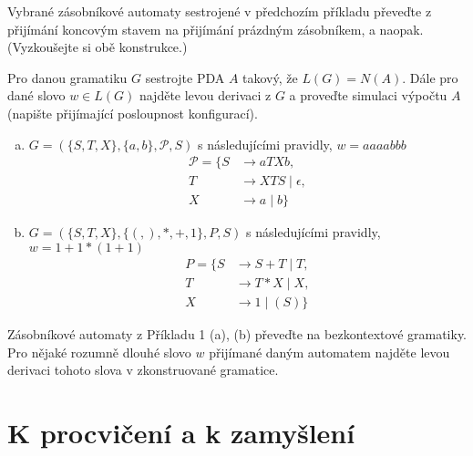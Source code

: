 \documentclass[a4paper,12pt]{amsart}
\begin{document}
\smallskip\begin{problem}

    Vybrané zásobníkové automaty sestrojené v předchozím příkladu převeďte z přijímání koncovým stavem na přijímání prázdným zásobníkem, a naopak. (Vyzkoušejte si obě konstrukce.)

\end{problem}


\smallskip\begin{problem}

    Pro danou gramatiku $G$ sestrojte PDA $A$ takový, že $L(G)=N(A)$. Dále pro dané slovo $w\in L(G)$ najděte levou derivaci z $G$ a proveďte simulaci výpočtu $A$ (napište přijímající posloupnost konfigurací).

    \begin{enumerate}[(a)]\setlength\itemsep{6pt}
        \item $G=(\{S,T,X\},\{a,b\},\mathcal P,S)$ s následujícími pravidly, $w=aaaabbb$
        \begin{align*}
            \mathcal P=\{S&\rightarrow aTXb, \\
            T&\rightarrow XTS\mid \epsilon,\\ 
            X&\rightarrow a\mid b\}
        \end{align*}
        \item $G=(\{S,T,X\},\{(,),*,+,1\},P,S)$ s následujícími pravidly, $w=1+1*(1+1)$
        \begin{align*}
            P=\{S&\rightarrow S+T\mid T, \\
            T&\rightarrow T*X\mid X,\\ 
            X&\rightarrow 1\mid (S)\}
        \end{align*}
    \end{enumerate}

\end{problem}
    

\begin{problem}

    Zásobníkové automaty z Příkladu 1 (a), (b) převeďte na bezkontextové gramatiky. Pro nějaké rozumně dlouhé slovo $w$ přijímané daným automatem najděte levou derivaci tohoto slova v zkonstruované gramatice.

\end{problem}


\section*{K procvičení a k zamyšlení}
\end{document}
